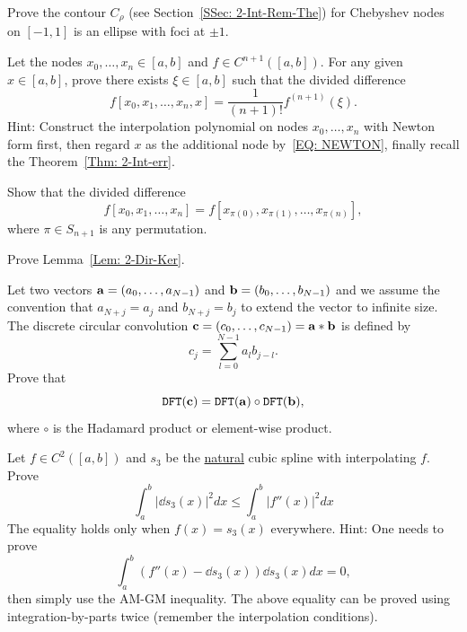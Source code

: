 \begin{problem}
    Prove the contour $C_{\rho}$ (see Section~\ref{SSec: 2-Int-Rem-The}) for Chebyshev nodes on $[-1, 1]$ is an ellipse with foci at $\pm 1$. 
\end{problem}
\begin{problem}
\label{Prb: 2-Theo-4}
    Let the nodes $x_0, \dots, x_n\in[a,b]$ and $f\in C^{n+1}([a, b])$. For any given $x\in[a, b]$, prove there exists $\xi\in [a, b]$ such that the divided difference $$f[x_0, x_1, \dots, x_n, x] = \frac{1}{(n+1)!}f^{(n+1)}(\xi).$$
    Hint: {Construct the interpolation polynomial on nodes $x_0, \dots, x_n$ with Newton form first, then regard $x$ as the additional node by~\eqref{EQ: NEWTON}, finally recall the Theorem~\ref{Thm: 2-Int-err}.}
\end{problem}
\begin{problem}
    Show that the divided difference $$f[x_0, x_1,\dots, x_n] = f[x_{\pi(0)}, x_{\pi(1)},\dots, x_{\pi(n)}],$$ where $\pi\in S_{n+1}$ is any permutation.
\end{problem}
\begin{problem}
\label{Prb: 2-Theo-6}
    Prove Lemma~\ref{Lem: 2-Dir-Ker}.
\end{problem}
\begin{problem}
    Let two vectors $\mathbf a = (a_0,\dots, a_{N-1})$ and $\mathbf b = (b_0, \dots, b_{N-1})$ and we assume the convention that $a_{N + j} = a_j$ and $b_{N+j} = b_j$ to extend the vector to infinite size. The discrete circular convolution $\mathbf c = (c_0,\dots, c_{N-1}) = \mathbf a\ast \mathbf b$ is defined by 
$$c_j = \sum_{l = 0}^{N-1} a_l b_{j - l}.$$
Prove that 
$$\textup{\texttt{DFT}}(\mathbf c) = \textup{\texttt{DFT}}(\mathbf a)\circ \textup{\texttt{DFT}}(\mathbf b),$$
where $\circ$ is the Hadamard product or element-wise product.
\end{problem}
\begin{problem} Let $f\in C^2([a, b])$ and $s_3$ be the \underline{natural} cubic spline with interpolating $f$. Prove 
    \begin{equation}
        \int_a^b |\dd{s_3}(x)|^2 dx \le \int_{a}^b |f''(x)|^2 dx 
    \end{equation}
    The equality holds only when $f(x) = s_3(x)$ everywhere.
    Hint: One needs to prove 
    \begin{equation}
        \int_a^b (f''(x) - \dd{s_3}(x)) \dd{s_3}(x) dx = 0,
    \end{equation}
    then simply use the AM-GM inequality. The above equality can be proved using integration-by-parts twice (remember the interpolation conditions).
\end{problem}
